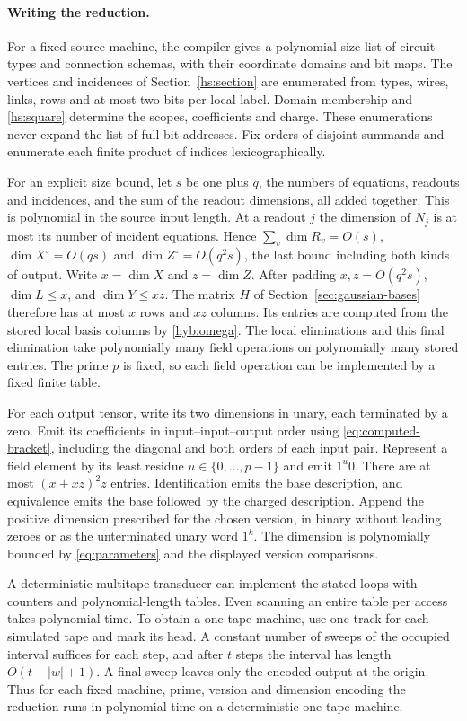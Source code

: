 \documentclass[11pt]{article}
\theoremstyle{definition}
\theoremstyle{remark}
\numberwithin{equation}{section}
\begin{document}
\paragraph{Writing the reduction.}
For a fixed source machine, the compiler gives a polynomial-size list
of circuit types and connection schemas, with their coordinate domains
and bit maps. The vertices and incidences of Section~\ref{hs:section}
are enumerated from types, wires, links, rows and at most two bits per
local label. Domain membership and \eqref{hs:square} determine the
scopes, coefficients and charge. These enumerations never expand the
list of full bit addresses. Fix orders of disjoint summands and
enumerate each finite product of indices lexicographically.

For an explicit size bound, let $s$ be one plus $q$, the numbers of
equations, readouts and incidences, and the sum of the readout
dimensions, all added together. This is polynomial in the source
input length. At a readout $j$ the dimension of $N_j$ is at most
its number of incident equations. Hence $\sum_v\dim R_v=O(s)$,
$\dim X^\circ=O(qs)$ and $\dim Z^\circ=O(q^2s)$, the last bound
including both kinds of output. Write $x=\dim X$ and $z=\dim Z$.
After padding $x,z=O(q^2s)$, $\dim L\le x$, and $\dim Y\le xz$.
The matrix $H$ of Section~\ref{sec:gaussian-bases} therefore has at
most $x$ rows and $xz$ columns. Its entries are computed from the stored
local basis columns by \eqref{hyb:omega}. The local eliminations and
this final elimination take polynomially many field operations on
polynomially many stored entries. The prime $p$ is fixed, so each
field operation can be implemented by a fixed finite table.

For each output tensor, write its two dimensions in unary, each
terminated by a zero. Emit its coefficients in input--input--output
order using \eqref{eq:computed-bracket}, including the diagonal and
both orders of each input pair. Represent a field element by its least
residue $u\in\{0,\ldots,p-1\}$ and emit $1^u0$. There are at most
$(x+xz)^2z$ entries. Identification emits the base description, and
equivalence emits the base followed by the charged description.
Append the positive dimension prescribed for the chosen version, in
binary without leading zeroes or as the unterminated unary word $1^k$.
The dimension is polynomially bounded by \eqref{eq:parameters} and
the displayed version comparisons.

A deterministic multitape transducer can implement the stated loops
with counters and polynomial-length tables. Even scanning an entire
table per access takes polynomial time. To obtain a one-tape machine,
use one track for each simulated tape and mark its head. A constant
number of sweeps of the occupied interval suffices for each step,
and after $t$ steps the interval has length $O(t+|w|+1)$. A final
sweep leaves only the encoded output at the origin. Thus for each
fixed machine, prime, version and dimension encoding the reduction
runs in polynomial time on a deterministic one-tape machine.
\end{document}
